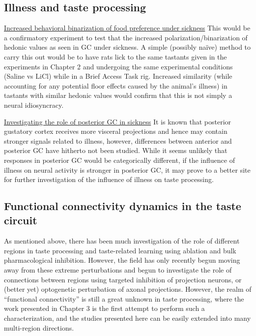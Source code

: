 \begin{refsection}
\subsection{Illness and taste processing}

\smallskip
\noindent \underline{Increased behavioral binarization of food preference under sickness} This would be a confirmatory experiment to test that the increased polarization/binarization of hedonic values as seen in GC under sickness. A simple (possibly naïve) method to carry this out would be to have rats lick to the same tastants given in the experiments in Chapter 2 and undergoing the same experimental conditions (Saline vs LiCl) while in a Brief Access Task rig. Increased similarity (while accounting for any potential floor effects caused by the animal’s illness) in tastants with similar hedonic values would confirm that this is not simply a neural idiosyncracy.

\smallskip
\noindent \underline{Investigating the role of posterior GC in sickness} It is known that posterior gustatory cortex receives more visceral projections and hence may contain stronger signals related to illness, however, differences between anterior and posterior GC have hitherto not been studied. While it seems unlikely that responses in posterior GC would be categorically different, if the influence of illness on neural activity is stronger in posterior GC, it may prove to a better site for further investigation of the influence of illness on taste processing.

\subsection{Functional connectivity dynamics in the taste circuit}
As mentioned above, there has been much investigation of the role of different regions in taste processing and taste-related learning using ablation and bulk pharmacological inhibition. However, the field has only recently begun moving away from these extreme perturbations and begun to investigate the role of connections between regions using targeted inhibition of projection neurons, or (better yet) optogenetic perturbation of axonal projections. However, the realm of “functional connectivity” is still a great unknown in taste processing, where the work presented in Chapter 3 is the first attempt to perform such a characterization, and the studies presented here can be easily extended into many multi-region directions.


\end{refsection}
